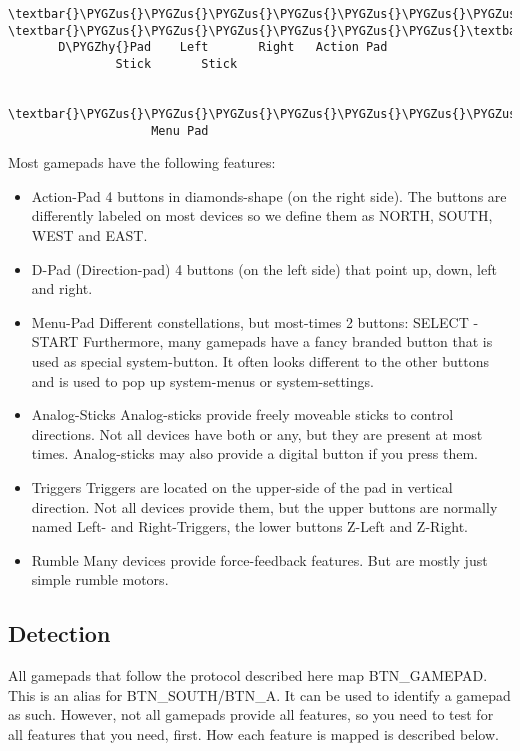 \documentclass[a4paper,8pt,english]{sphinxmanual}
\def\PYGZus{\char`\_}
\def\PYGZhy{\char`\-}
\begin{document}
\begin{Verbatim}[commandchars=\\\{\}]
     \textbar{}\PYGZus{}\PYGZus{}\PYGZus{}\PYGZus{}\PYGZus{}\PYGZus{}\PYGZus{}\PYGZus{}\textbar{}\PYGZus{}\PYGZus{}\PYGZus{}\PYGZus{}\PYGZus{}\PYGZus{}\textbar{}    \textbar{}\PYGZus{}\PYGZus{}\PYGZus{}\PYGZus{}\PYGZus{}\PYGZus{}\textbar{}\PYGZus{}\PYGZus{}\PYGZus{}\PYGZus{}\PYGZus{}\PYGZus{}\PYGZus{}\PYGZus{}\PYGZus{}\PYGZus{}\PYGZus{}\textbar{}
       D\PYGZhy{}Pad    Left       Right   Action Pad
               Stick       Stick

                 \textbar{}\PYGZus{}\PYGZus{}\PYGZus{}\PYGZus{}\PYGZus{}\PYGZus{}\PYGZus{}\PYGZus{}\PYGZus{}\PYGZus{}\PYGZus{}\PYGZus{}\PYGZus{}\textbar{}
                    Menu Pad
\end{Verbatim}

Most gamepads have the following features:
\begin{itemize}
\item {} 
Action-Pad
4 buttons in diamonds-shape (on the right side). The buttons are
differently labeled on most devices so we define them as NORTH,
SOUTH, WEST and EAST.

\item {} 
D-Pad (Direction-pad)
4 buttons (on the left side) that point up, down, left and right.

\item {} 
Menu-Pad
Different constellations, but most-times 2 buttons: SELECT - START
Furthermore, many gamepads have a fancy branded button that is used as
special system-button. It often looks different to the other buttons and
is used to pop up system-menus or system-settings.

\item {} 
Analog-Sticks
Analog-sticks provide freely moveable sticks to control directions. Not
all devices have both or any, but they are present at most times.
Analog-sticks may also provide a digital button if you press them.

\item {} 
Triggers
Triggers are located on the upper-side of the pad in vertical direction.
Not all devices provide them, but the upper buttons are normally named
Left- and Right-Triggers, the lower buttons Z-Left and Z-Right.

\item {} 
Rumble
Many devices provide force-feedback features. But are mostly just
simple rumble motors.

\end{itemize}


\subsection{Detection}
\label{input/gamepad:detection}
All gamepads that follow the protocol described here map BTN\_GAMEPAD. This is
an alias for BTN\_SOUTH/BTN\_A. It can be used to identify a gamepad as such.
However, not all gamepads provide all features, so you need to test for all
features that you need, first. How each feature is mapped is described below.
\end{document}

